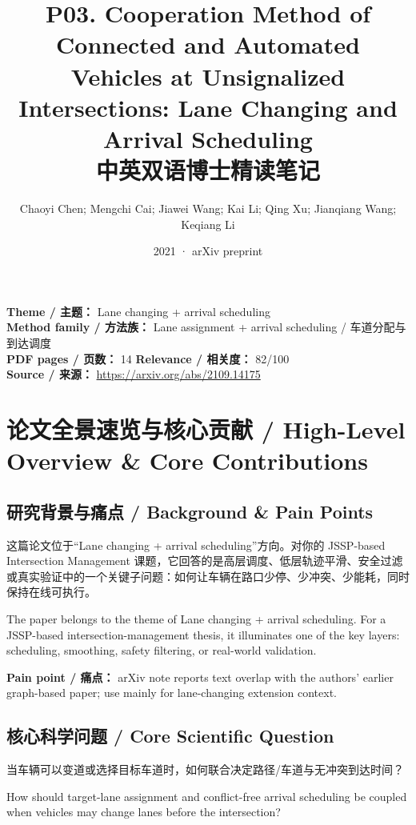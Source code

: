 \documentclass[UTF8,a4paper,11pt,fontset=fandol]{ctexart}
\title{P03. Cooperation Method of Connected and Automated Vehicles at Unsignalized Intersections: Lane Changing and Arrival Scheduling\\中英双语博士精读笔记}
\author{Chaoyi Chen; Mengchi Cai; Jiawei Wang; Kai Li; Qing Xu; Jianqiang Wang; Keqiang Li}
\date{2021 · arXiv preprint}
\begin{document}
\maketitle

\noindent\textbf{Theme / 主题：} Lane changing + arrival scheduling\\
\textbf{Method family / 方法族：} Lane assignment + arrival scheduling / 车道分配与到达调度\\
\textbf{PDF pages / 页数：} 14 \quad
\textbf{Relevance / 相关度：} 82/100\\
\textbf{Source / 来源：} \url{https://arxiv.org/abs/2109.14175}

\section{论文全景速览与核心贡献 / High-Level Overview \& Core Contributions}
\subsection{研究背景与痛点 / Background \& Pain Points}
这篇论文位于“Lane changing + arrival scheduling”方向。对你的 JSSP-based Intersection Management 课题，它回答的是高层调度、低层轨迹平滑、安全过滤或真实验证中的一个关键子问题：如何让车辆在路口少停、少冲突、少能耗，同时保持在线可执行。

The paper belongs to the theme of Lane changing + arrival scheduling. For a JSSP-based intersection-management thesis, it illuminates one of the key layers: scheduling, smoothing, safety filtering, or real-world validation.

\textbf{Pain point / 痛点：} arXiv note reports text overlap with the authors' earlier graph-based paper; use mainly for lane-changing extension context.

\subsection{核心科学问题 / Core Scientific Question}
当车辆可以变道或选择目标车道时，如何联合决定路径/车道与无冲突到达时间？

How should target-lane assignment and conflict-free arrival scheduling be coupled when vehicles may change lanes before the intersection?
\end{document}
